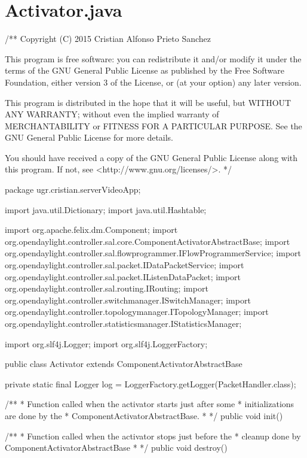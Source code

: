 \documentclass[a4paper,11pt]{book}
\begin{document}
\section{Activator.java}\label{activator}
\begin{java}
/**
Copyright (C) 2015  Cristian Alfonso Prieto Sanchez

This program is free software: you can redistribute it and/or modify
it under the terms of the GNU General Public License as published by
the Free Software Foundation, either version 3 of the License, or
(at your option) any later version.

This program is distributed in the hope that it will be useful,
but WITHOUT ANY WARRANTY; without even the implied warranty of
MERCHANTABILITY or FITNESS FOR A PARTICULAR PURPOSE. See the
GNU General Public License for more details.

You should have received a copy of the GNU General Public License
along with this program. If not, see <http://www.gnu.org/licenses/>.
*/

package ugr.cristian.serverVideoApp;

import java.util.Dictionary;
import java.util.Hashtable;

import org.apache.felix.dm.Component;
import org.opendaylight.controller.sal.core.ComponentActivatorAbstractBase;
import org.opendaylight.controller.sal.flowprogrammer.IFlowProgrammerService;
import org.opendaylight.controller.sal.packet.IDataPacketService;
import org.opendaylight.controller.sal.packet.IListenDataPacket;
import org.opendaylight.controller.sal.routing.IRouting;
import org.opendaylight.controller.switchmanager.ISwitchManager;
import org.opendaylight.controller.topologymanager.ITopologyManager;
import org.opendaylight.controller.statisticsmanager.IStatisticsManager;

import org.slf4j.Logger;
import org.slf4j.LoggerFactory;

public class Activator extends ComponentActivatorAbstractBase {
    private static final Logger log = LoggerFactory.getLogger(PacketHandler.class);


    /**
     * Function called when the activator starts just after some
     * initializations are done by the
     * ComponentActivatorAbstractBase.
     *
     */
    public void init() {
    }

    /**
     * Function called when the activator stops just before the
     * cleanup done by ComponentActivatorAbstractBase
     *
     */
    public void destroy() {

}}
\end{java}
\end{document}
